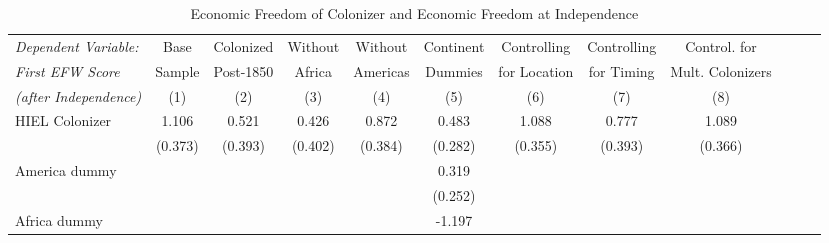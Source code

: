 \begin{sidewaystable}[h!]
\begin{threeparttable}
\begin{center}
\begin{minipage}{\textwidth}
\small
\caption{Economic Freedom of Colonizer and Economic Freedom at Independence}
\label{tab:Tab5}
\begin{tabular*}{\textwidth}{@{\extracolsep{\fill}}lccccccccccc@{\extracolsep{\fill}}}
\hline\hline
            \textit{Dependent Variable:}&\multicolumn{1}{c}{Base}&\multicolumn{1}{c}{Colonized}&\multicolumn{1}{c}{Without}&\multicolumn{1}{c}{Without}&\multicolumn{1}{c}{Continent}&\multicolumn{1}{c}{Controlling}&\multicolumn{1}{c}{Controlling}&\multicolumn{1}{c}{Control. for}\\
            \textit{First EFW Score}&\multicolumn{1}{c}{Sample}&\multicolumn{1}{c}{Post-1850}&\multicolumn{1}{c}{Africa}&\multicolumn{1}{c}{Americas}&\multicolumn{1}{c}{Dummies}&\multicolumn{1}{c}{for Location}&\multicolumn{1}{c}{for Timing}&\multicolumn{1}{c}{Mult. Colonizers}\\
            \textit{(after Independence)}&\multicolumn{1}{c}{(1)}&\multicolumn{1}{c}{(2)}&\multicolumn{1}{c}{(3)}&\multicolumn{1}{c}{(4)}&\multicolumn{1}{c}{(5)}&\multicolumn{1}{c}{(6)}&\multicolumn{1}{c}{(7)}&\multicolumn{1}{c}{(8)}\\
\hline
HIEL Colonizer &       1.106\sym{***}&       0.521         &       0.426         &       0.872\sym{**} &       0.483\sym{*}  &       1.088\sym{***}&       0.777\sym{*}  &       1.089\sym{***}\\
            &     (0.373)         &     (0.393)         &     (0.402)         &     (0.384)         &     (0.282)         &     (0.355)         &     (0.393)         &     (0.366)         \\
[0.125em]
America dummy &                     &                     &                     &                     &       0.319         &                     &                     &                     \\
            &                     &                     &                     &                     &     (0.252)         &                     &                     &                     \\
[0.125em]
Africa dummy      &                     &                     &                     &                     &      -1.197\sym{***}&                     &                     &                     \\

\end{tabular*}
\end{minipage}
\end{center}
\end{threeparttable}
\end{sidewaystable}
